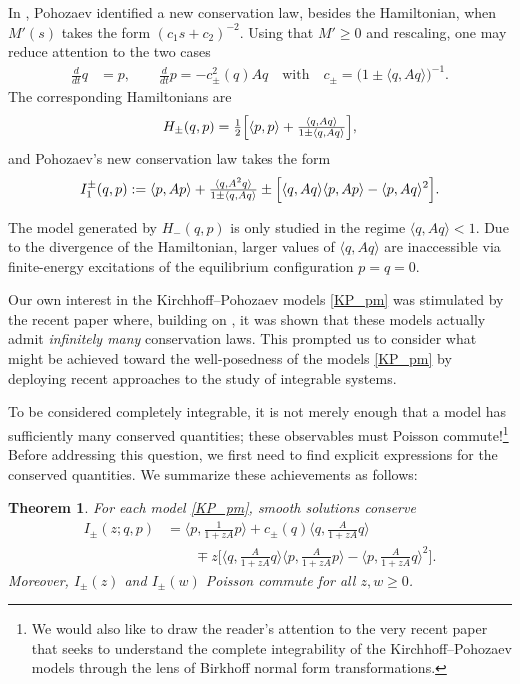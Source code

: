 \documentclass{amsart}
\newcommand{\qtq}[1]{\quad\text{#1}\quad}
\newtheorem{theorem}{Theorem}[section]
\theoremstyle{definition}
\numberwithin{equation}{section}
\newcommand{\la}{\langle}
\newcommand{\ra}{\rangle}
\begin{document}
In \cite{Pohozaev85}, Pohozaev identified a new conservation law, besides the Hamiltonian, when $M'(s)$ takes the form $(c_1 s +c_2)^{-2}$.  Using that $M'\geq 0$ and rescaling, one may reduce attention to the two cases
\begin{align}\label{KP_pm}
\tfrac{d}{dt}q  &= p, \qquad \tfrac{d}{dt}p = -c_\pm^2(q) A q \qtq{with} c_\pm = (1 \pm \langle q,A q\rangle\bigr)^{-1} .
\end{align}
The corresponding Hamiltonians are
\begin{equation}\label{Hamiltonian}
H_\pm(q,p) = \tfrac12 \Bigl[\langle p, p\rangle + \tfrac{\langle q, A q\rangle}{1 \pm \langle q, A q\rangle}\Bigr],
\end{equation}
and Pohozaev's new conservation law takes the form
\begin{align}\label{I Poho}
I_1^\pm(q,p) :=  \langle p, A p\rangle + \tfrac{\langle q, A^{2} q\rangle}{1 \pm \langle q, A q\rangle}
	\pm \Bigl[ \langle q, A q\rangle \langle p, A p\rangle - \langle p, A q\rangle^2 \Bigr].
\end{align}

The model generated by $H_-(q,p)$ is only studied in the regime $\langle q, A q\rangle < 1$. Due to the divergence of the Hamiltonian, larger values of $\la q, Aq\ra$ are inaccessible via finite-energy excitations of the equilibrium configuration $p=q=0$.

Our own interest in the Kirchhoff--Pohozaev models \eqref{KP_pm} was stimulated by the recent paper \cite{BM26} where, building on \cite{BM25}, it was shown that these models actually admit \emph{infinitely many} conservation laws.  This prompted us to consider what might be achieved toward the well-posedness of the models \eqref{KP_pm} by deploying recent approaches to the study of integrable systems. 

To be considered completely integrable, it is not merely enough that a model has sufficiently many conserved quantities; these observables must Poisson commute!\footnote{We would also like to draw the reader's attention to the very recent paper \cite{HM} that seeks to understand the complete integrability of the Kirchhoff--Pohozaev models through the lens of Birkhoff normal form transformations.}  Before addressing this question, we first need to find explicit expressions for the conserved quantities.  We summarize these achievements as follows:

\begin{theorem}\label{T:1.1}
For each model \eqref{KP_pm}, smooth solutions conserve
\begin{equation}\label{E:Iz combined}
\begin{aligned}
I_\pm(z;q,p)&=\langle p,\tfrac{1}{1+zA}p\rangle+c_\pm(q)\langle q,\tfrac{A}{1+zA}q\rangle\\
&\qquad \mp z\bigl[\langle q,\tfrac{A}{1+ zA}q\rangle\langle p,\tfrac{A}{1+ zA}p\rangle-\langle p,\tfrac{A}{1+ zA}q\rangle^2\bigr].
\end{aligned}
\end{equation}
Moreover, $I_\pm(z)$ and $I_\pm(w)$ Poisson commute for all $z,w\geq 0$.
\end{theorem}
\end{document}
